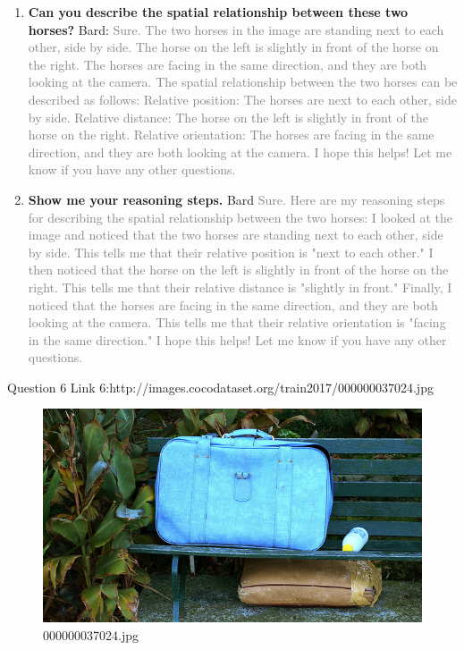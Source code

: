     \begin{enumerate}
        \item \textbf{Can you describe the spatial relationship between these two horses?}
        \subitem Bard: \textcolor{gray}{
            Sure. The two horses in the image are standing next to each other, side by side. The horse on the left is slightly in front of the horse on the right. The horses are facing in the same direction, and they are both looking at the camera. The spatial relationship between the two horses can be described as follows:
            Relative position: The horses are next to each other, side by side.
            Relative distance: The horse on the left is slightly in front of the horse on the right.
            Relative orientation: The horses are facing in the same direction, and they are both looking at the camera.
            I hope this helps! Let me know if you have any other questions.}
        \item \textbf{Show me your reasoning steps.}
        \subitem Bard \textcolor{gray}{
            Sure. Here are my reasoning steps for describing the spatial relationship between the two horses:
            I looked at the image and noticed that the two horses are standing next to each other, side by side. This tells me that their relative position is "next to each other."
            I then noticed that the horse on the left is slightly in front of the horse on the right. This tells me that their relative distance is "slightly in front."
            Finally, I noticed that the horses are facing in the same direction, and they are both looking at the camera. This tells me that their relative orientation is "facing in the same direction."
            I hope this helps! Let me know if you have any other questions.}
    \end{enumerate}
Question 6
Link 6:http://images.cocodataset.org/train2017/000000037024.jpg
    \begin{figure}[h]
        \centering
        \includegraphics[width=0.8\linewidth]{../image set/easy/000000037024.jpg}
        \caption{000000037024.jpg}
    \end{figure}
